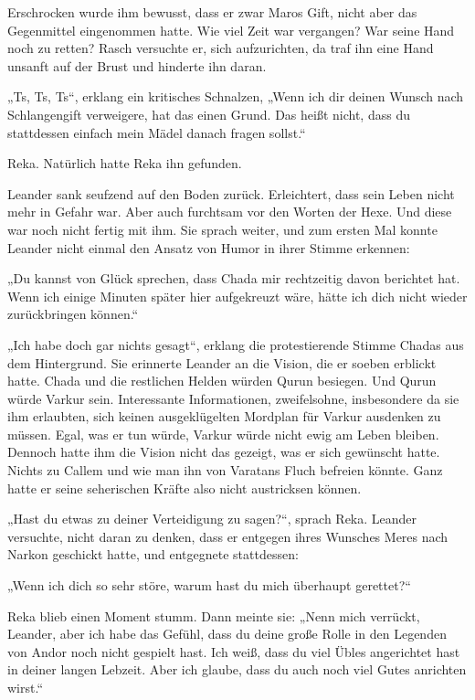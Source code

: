 \documentclass[10pt, a4paper, oneside]{book}
\begin{document}
Erschrocken wurde ihm bewusst, dass er zwar Maros Gift, nicht aber das Gegenmittel eingenommen hatte. Wie viel Zeit war vergangen? War seine Hand noch zu retten? Rasch versuchte er, sich aufzurichten, da traf ihn eine Hand unsanft auf der Brust und hinderte ihn daran.

„Ts, Ts, Ts“, erklang ein kritisches Schnalzen, „Wenn ich dir deinen Wunsch nach Schlangengift verweigere, hat das einen Grund. Das heißt nicht, dass du stattdessen einfach mein Mädel danach fragen sollst.“

Reka. Natürlich hatte Reka ihn gefunden.

Leander sank seufzend auf den Boden zurück. Erleichtert, dass sein Leben nicht mehr in Gefahr war. Aber auch furchtsam vor den Worten der Hexe. Und diese war noch nicht fertig mit ihm. Sie sprach weiter, und zum ersten Mal konnte Leander nicht einmal den Ansatz von Humor in ihrer Stimme erkennen:

„Du kannst von Glück sprechen, dass Chada mir rechtzeitig davon berichtet hat. Wenn ich einige Minuten später hier aufgekreuzt wäre, hätte ich dich nicht wieder zurückbringen können.“

„Ich habe doch gar nichts gesagt“, erklang die protestierende Stimme Chadas aus dem Hintergrund. Sie erinnerte Leander an die Vision, die er soeben erblickt hatte. Chada und die restlichen Helden würden Qurun besiegen. Und Qurun würde Varkur sein. Interessante Informationen, zweifelsohne, insbesondere da sie ihm erlaubten, sich keinen ausgeklügelten Mordplan für Varkur ausdenken zu müssen. Egal, was er tun würde, Varkur würde nicht ewig am Leben bleiben. Dennoch hatte ihm die Vision nicht das gezeigt, was er sich gewünscht hatte. Nichts zu Callem und wie man ihn von Varatans Fluch befreien könnte. Ganz hatte er seine seherischen Kräfte also nicht austricksen können.

„Hast du etwas zu deiner Verteidigung zu sagen?“, sprach Reka. Leander versuchte, nicht daran zu denken, dass er entgegen ihres Wunsches Meres nach Narkon geschickt hatte, und entgegnete stattdessen:

„Wenn ich dich so sehr störe, warum hast du mich überhaupt gerettet?“

Reka blieb einen Moment stumm. Dann meinte sie: „Nenn mich verrückt, Leander, aber ich habe das Gefühl, dass du deine große Rolle in den Legenden von Andor noch nicht gespielt hast. Ich weiß, dass du viel Übles angerichtet hast in deiner langen Lebzeit. Aber ich glaube, dass du auch noch viel Gutes anrichten wirst.“
\end{document}
